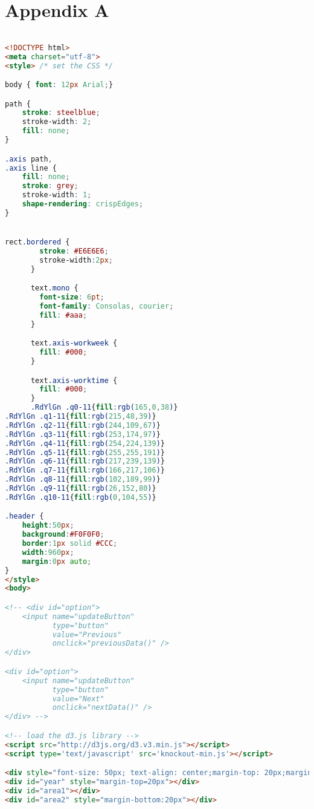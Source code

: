 \chapter{Appendix A}
\label{chp:appendixa} 
\begin{lstlisting}[language=HTML]

<!DOCTYPE html>
<meta charset="utf-8">
<style> /* set the CSS */

body { font: 12px Arial;}

path { 
    stroke: steelblue;
    stroke-width: 2;
    fill: none;
}

.axis path,
.axis line {
    fill: none;
    stroke: grey;
    stroke-width: 1;
    shape-rendering: crispEdges;
}


rect.bordered {
        stroke: #E6E6E6;
        stroke-width:2px;   
      }

      text.mono {
        font-size: 6pt;
        font-family: Consolas, courier;
        fill: #aaa;
      }

      text.axis-workweek {
        fill: #000;
      }

      text.axis-worktime {
        fill: #000;
      }
      .RdYlGn .q0-11{fill:rgb(165,0,38)}
.RdYlGn .q1-11{fill:rgb(215,48,39)}
.RdYlGn .q2-11{fill:rgb(244,109,67)}
.RdYlGn .q3-11{fill:rgb(253,174,97)}
.RdYlGn .q4-11{fill:rgb(254,224,139)}
.RdYlGn .q5-11{fill:rgb(255,255,191)}
.RdYlGn .q6-11{fill:rgb(217,239,139)}
.RdYlGn .q7-11{fill:rgb(166,217,106)}
.RdYlGn .q8-11{fill:rgb(102,189,99)}
.RdYlGn .q9-11{fill:rgb(26,152,80)}
.RdYlGn .q10-11{fill:rgb(0,104,55)}

.header {
    height:50px;
    background:#F0F0F0;
    border:1px solid #CCC;
    width:960px;
    margin:0px auto;
}
</style>
<body>

<!-- <div id="option">
    <input name="updateButton" 
           type="button" 
           value="Previous" 
           onclick="previousData()" />
</div>

<div id="option">
    <input name="updateButton" 
           type="button" 
           value="Next" 
           onclick="nextData()" />
</div> -->

<!-- load the d3.js library -->    
<script src="http://d3js.org/d3.v3.min.js"></script>
<script type='text/javascript' src='knockout-min.js'></script>

<div style="font-size: 50px; text-align: center;margin-top: 20px;margin-bottom: 20px"data-bind="text: currentDate()"></div>
<div id="year" style="margin-top=20px"></div>
<div id="area1"></div>
<div id="area2" style="margin-bottom:20px"></div>


\end{lstlisting}
